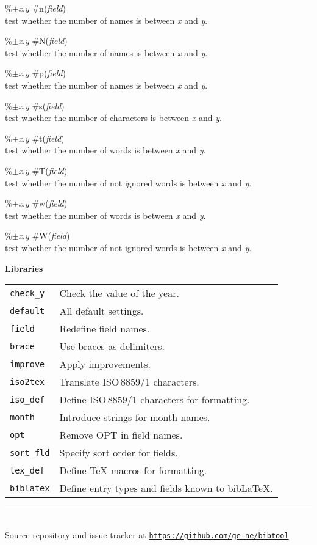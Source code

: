 \documentclass[a4paper]{article}
\newenvironment{FlatList}{\begin{list}{}{%
      \topsep=0pt\itemsep=0pt\parsep=0pt\let\makelabel=\flatlistlabel}}{\end{list}}%
\newcommand\flatlistlabel[1]{\descriptionlabel{\textsf{#1}}}
\newcommand\Section[1]{\begin{center}\normalsize\bfseries
    #1\end{center}\nobreak }
\newcommand\Lib[1]{\texttt{#1}}
\newcommand\link[1]{\href{#1}{\texttt{#1}}}
\begin{document}
\begin{multicols}{4}
\begin{FlatList}
  \item [\%$\pm ${\it x}.{\it y}\/ \#n({\it field}\/)]\ \\
    test whether the  number of names is between {\it x}\/ and {\it y}.
  \item [\%$\pm ${\it x}.{\it y}\/ \#N({\it field}\/)]\ \\
    test whether the  number of names is between {\it x}\/ and {\it y}.
  \item [\%$\pm ${\it x}.{\it y}\/ \#p({\it field}\/)]\ \\
    test whether the  number of names is between {\it x}\/ and {\it y}.
  \item [\%$\pm ${\it x}.{\it y}\/ \#s({\it field}\/)]\ \\
    test whether the  number of characters is between {\it x}\/ and {\it y}.
  \item [\%$\pm ${\it x}.{\it y}\/ \#t({\it field}\/)]\ \\
    test whether the  number of words is between {\it x}\/ and {\it y}.
  \item [\%$\pm ${\it x}.{\it y}\/ \#T({\it field}\/)]\ \\
    test whether the  number of not ignored words is between {\it x}\/
    and {\it y}. 
  \item [\%$\pm ${\it x}.{\it y}\/ \#w({\it field}\/)]\ \\
    test whether the  number of words is between {\it x}\/ and {\it y}.
  \item [\%$\pm ${\it x}.{\it y}\/ \#W({\it field}\/)]\ \\
    test whether the  number of not ignored words is between {\it x}\/
    and {\it y}. 
  \end{FlatList} 

  \columnbreak
  \Section{Libraries}
  \begin{tabular}{lp{}}
  \Lib{check\_y}	& Check the value of the year.\\
  \Lib{default}		& All default settings.\\
  \Lib{field}		& Redefine field names.\\
  \Lib{brace}		& Use braces as delimiters.\\
  \Lib{improve}		& Apply improvements.\\
  \Lib{iso2tex}		& Translate ISO\,8859/1 characters.\\
  \Lib{iso\_def}	& Define ISO\,8859/1 characters for formatting.\\
  \Lib{month}		& Introduce strings for month names.\\
  \Lib{opt}		& Remove OPT in field names.\\
  \Lib{sort\_fld}	& Specify sort order for fields.\\
  \Lib{tex\_def}	& Define \TeX{} macros for formatting.\\
  \Lib{biblatex}	& Define entry types and fields known to bib\-\LaTeX.\\
  \end{tabular}
\end{multicols}
\vfill\vfill\vfill
\begin{center}\rule{.8\textwidth}{.1pt}\\
Source repository and issue tracker at \link{https://github.com/ge-ne/bibtool}
\end{center}
\end{document}

